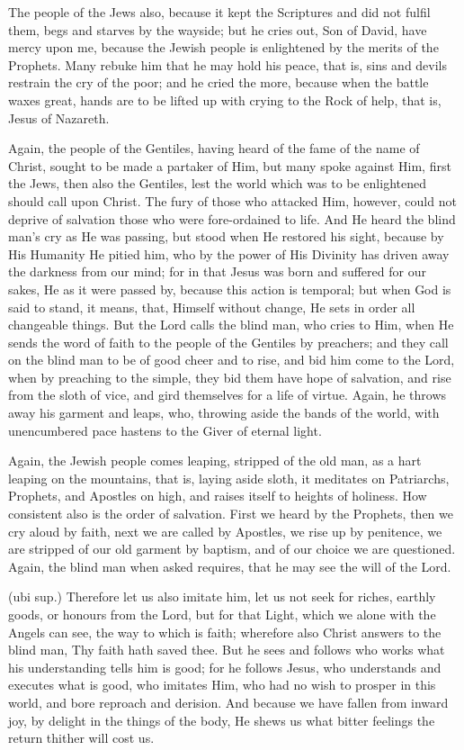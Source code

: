  The people of the Jews also, because it kept the Scriptures and did not fulfil them, begs and starves by the wayside; but he cries out, Son of David, have mercy upon me, because the Jewish people is enlightened by the merits of the Prophets. Many rebuke him that he may hold his peace, that is, sins and devils restrain the cry of the poor; and he cried the more, because when the battle waxes great, hands are to be lifted up with crying to the Rock of help, that is, Jesus of Nazareth.

 Again, the people of the Gentiles, having heard of the fame of the name of Christ, sought to be made a partaker of Him, but many spoke against Him, first the Jews, then also the Gentiles, lest the world which was to be enlightened should call upon Christ. The fury of those who attacked Him, however, could not deprive of salvation those who were fore-ordained to life. And He heard the blind man’s cry as He was passing, but stood when He restored his sight, because by His Humanity He pitied him, who by the power of His Divinity has driven away the darkness from our mind; for in that Jesus was born and suffered for our sakes, He as it were passed by, because this action is temporal; but when God is said to stand, it means, that, Himself without change, He sets in order all changeable things. But the Lord calls the blind man, who cries to Him, when He sends the word of faith to the people of the Gentiles by preachers; and they call on the blind man to be of good cheer and to rise, and bid him come to the Lord, when by preaching to the simple, they bid them have hope of salvation, and rise from the sloth of vice, and gird themselves for a life of virtue. Again, he throws away his garment and leaps, who, throwing aside the bands of the world, with unencumbered pace hastens to the Giver of eternal light.

 Again, the Jewish people comes leaping, stripped of the old man, as a hart leaping on the mountains, that is, laying aside sloth, it meditates on Patriarchs, Prophets, and Apostles on high, and raises itself to heights of holiness. How consistent also is the order of salvation. First we heard by the Prophets, then we cry aloud by faith, next we are called by Apostles, we rise up by penitence, we are stripped of our old garment by baptism, and of our choice we are questioned. Again, the blind man when asked requires, that he may see the will of the Lord.

 (ubi sup.) Therefore let us also imitate him, let us not seek for riches, earthly goods, or honours from the Lord, but for that Light, which we alone with the Angels can see, the way to which is faith; wherefore also Christ answers to the blind man, Thy faith hath saved thee. But he sees and follows who works what his understanding tells him is good; for he follows Jesus, who understands and executes what is good, who imitates Him, who had no wish to prosper in this world, and bore reproach and derision. And because we have fallen from inward joy, by delight in the things of the body, He shews us what bitter feelings the return thither will cost us.

